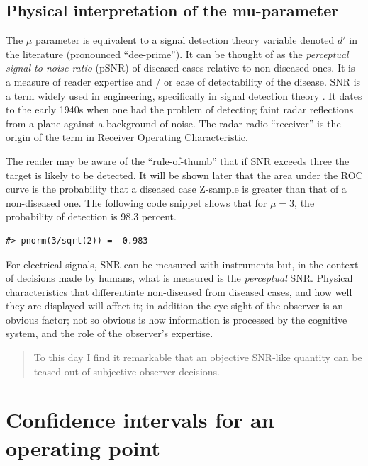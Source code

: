 \documentclass[
]{book}
\begin{document}
\hypertarget{binary-task-model-mu-parameter-intepretation}{%
\subsection{Physical interpretation of the mu-parameter}\label{binary-task-model-mu-parameter-intepretation}}

The \(\mu\) parameter is equivalent \citep{macmillan2004detection} to a signal detection theory variable denoted \(d'\) in the literature (pronounced ``dee-prime''). It can be thought of as the \emph{perceptual signal to noise ratio} (pSNR) of diseased cases relative to non-diseased ones. It is a measure of reader expertise and / or ease of detectability of the disease. SNR is a term widely used in engineering, specifically in signal detection theory \citep{green1966signal, egan1975book}. It dates to the early 1940s when one had the problem \citep[\citet{marcum1960statistical}]{marcum1947statistical} of detecting faint radar reflections from a plane against a background of noise. The radar radio ``receiver'' is the origin of the term in Receiver Operating Characteristic.

The reader may be aware of the ``rule-of-thumb'' that if SNR exceeds three the target is likely to be detected. It will be shown later that the area under the ROC curve is the probability that a diseased case Z-sample is greater than that of a non-diseased one. The following code snippet shows that for \(\mu = 3\), the probability of detection is 98.3 percent.

\begin{verbatim}
#> pnorm(3/sqrt(2)) =  0.983
\end{verbatim}

For electrical signals, SNR can be measured with instruments but, in the context of decisions made by humans, what is measured is the \emph{perceptual} SNR. Physical characteristics that differentiate non-diseased from diseased cases, and how well they are displayed will affect it; in addition the eye-sight of the observer is an obvious factor; not so obvious is how information is processed by the cognitive system, and the role of the observer's expertise.

\begin{quote}
To this day I find it remarkable that an objective SNR-like quantity can be teased out of subjective observer decisions.
\end{quote}

\hypertarget{binary-task-model-confidence-intervals}{%
\section{Confidence intervals for an operating point}\label{binary-task-model-confidence-intervals}}
\end{document}
